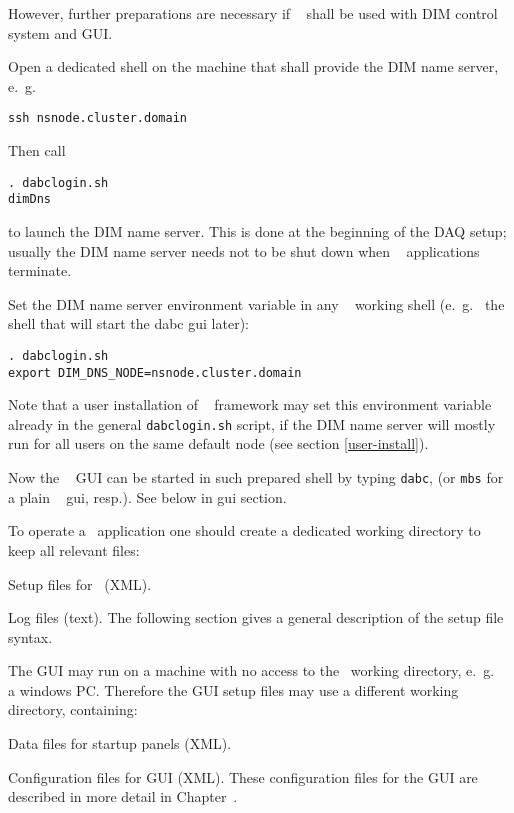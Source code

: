 However, further preparations are necessary if \dabc~ shall be used with
DIM control system and GUI.

\item Open a dedicated shell on the machine that shall provide the DIM name server,
e.~g.~ 
\begin{small}
\begin{verbatim}
ssh nsnode.cluster.domain
\end{verbatim}
\end{small}
Then call 
\begin{small}
\begin{verbatim}
. dabclogin.sh
dimDns  
\end{verbatim} 
\end{small}
to launch the DIM name server. This is done  at the beginning of
the DAQ setup; usually the DIM name server needs not to be shut down 
when \dabc~ applications terminate.

\item Set the DIM name server environment variable in any \dabc~ working shell (e.~g.~
the shell that will start the dabc gui later):
\begin{small}
\begin{verbatim}
. dabclogin.sh
export DIM_DNS_NODE=nsnode.cluster.domain
\end{verbatim} 
\end{small}
Note that a user installation of \dabc~ framework may set this 
environment variable already in the general {\tt dabclogin.sh} script, if the DIM name server will 
mostly run for all users on the same default node (see section \ref{user-install}).  

\item Now the \dabc~ GUI can be started in such prepared shell by typing {\tt dabc}, (or 
{\tt mbs} for a plain \mbs~ gui, resp.). See below in gui section.  

\enum

\medskip
To operate a \dabc\ application one should create a dedicated 
working directory to keep all relevant files:
\bbul
\item Setup files for \dabc\ (XML).
\item Log files (text).
\ebul
The following section  
gives a general description of the setup file syntax.

The GUI may run on a machine with no access to the \dabc\ working directory,
e.~g.~ a windows PC.
Therefore the GUI setup files may use a different
working directory, containing: 
\bbul
\item Data files for startup panels (XML).
\item Configuration files for GUI (XML).
\ebul
These configuration files for the GUI are described in more detail 
in Chapter~.

